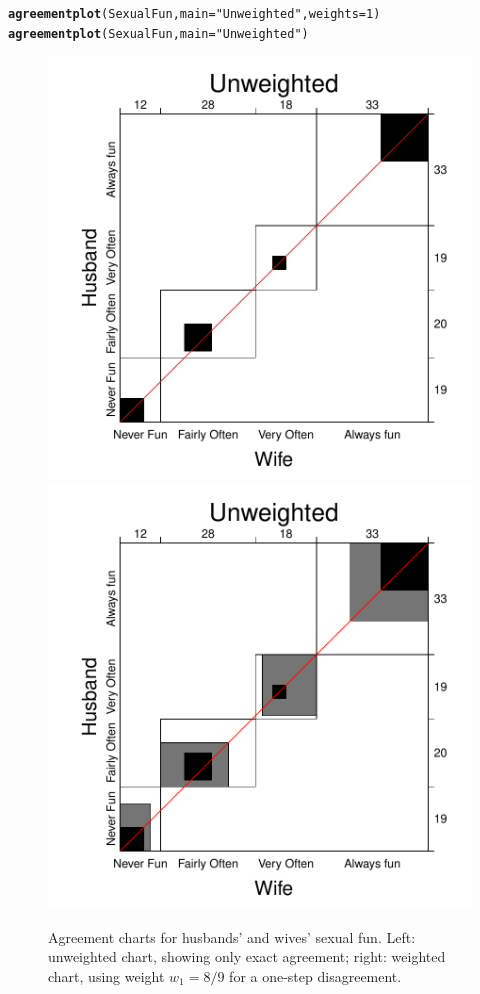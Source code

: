 \documentclass[11pt]{book}\usepackage[]{graphicx}\usepackage[]{color}
\makeatletter
\newcommand{\hlnum}[1]{\textcolor[rgb]{0.686,0.059,0.569}{#1}}%
\newcommand{\hlstr}[1]{\textcolor[rgb]{0.192,0.494,0.8}{#1}}%
\newcommand{\hlstd}[1]{\textcolor[rgb]{0.345,0.345,0.345}{#1}}%
\newcommand{\hlkwc}[1]{\textcolor[rgb]{0.333,0.667,0.333}{#1}}%
\newcommand{\hlkwd}[1]{\textcolor[rgb]{0.737,0.353,0.396}{\textbf{#1}}}%
\newenvironment{kframe}{%
 \def\at@end@of@kframe{}%
 \ifinner\ifhmode%
  \def\at@end@of@kframe{\end{minipage}}%
  \begin{minipage}{\columnwidth}%
 \fi\fi%
 \def\FrameCommand##1{\hskip\@totalleftmargin \hskip-\fboxsep
 \colorbox{shadecolor}{##1}\hskip-\fboxsep
     \hskip-\linewidth \hskip-\@totalleftmargin \hskip\columnwidth}%
 \MakeFramed {\advance\hsize-\width
   \@totalleftmargin\z@ \linewidth\hsize
   \@setminipage}}%
 {\par\unskip\endMakeFramed%
 \at@end@of@kframe}
\newenvironment{knitrout}{}{} %
\renewenvironment{knitrout}{\small\renewcommand{\baselinestretch}{.85}}{} %
\makeatother
\begin{document}
\begin{knitrout}
\color{fgcolor}\begin{kframe}
\begin{alltt}
\hlkwd{agreementplot}\hlstd{(SexualFun,} \hlkwc{main}\hlstd{=}\hlstr{"Unweighted"}\hlstd{,} \hlkwc{weights}\hlstd{=}\hlnum{1}\hlstd{)}
\hlkwd{agreementplot}\hlstd{(SexualFun,} \hlkwc{main}\hlstd{=}\hlstr{"Unweighted"}\hlstd{)}
\end{alltt}
\end{kframe}\begin{figure}[htbp]


\centerline{\includegraphics[width=.48\textwidth]{ch04/fig/sexfun-agree1} 
\includegraphics[width=.48\textwidth]{ch04/fig/sexfun-agree2} }

\caption[Agreement charts for husbands' and wives' sexual fun]{Agreement charts for husbands' and wives' sexual fun. Left: unweighted chart, showing only exact agreement; right: weighted chart, using weight $w_1 = 8/9$ for a one-step disagreement.\label{fig:sexfun-agree}}
\end{figure}


\end{knitrout}

\end{document}
